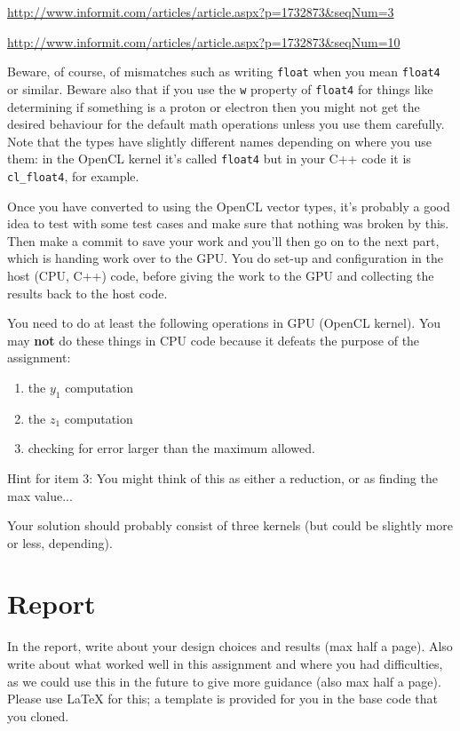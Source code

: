 \documentclass[letterpaper,10pt]{article}
\begin{document}
\begin{center}

\url{http://www.informit.com/articles/article.aspx?p=1732873&seqNum=3}

\url{http://www.informit.com/articles/article.aspx?p=1732873&seqNum=10}

\end{center}

Beware, of course, of mismatches such as writing \texttt{float} when you mean 
\texttt{float4} or similar. Beware also that if you use the \texttt{w} property 
of \texttt{float4} for things like determining if something is a proton or electron 
then you might not get the desired behaviour for the default math operations unless
you use them carefully. 
Note that the types have slightly different names 
depending on where you use them: in the OpenCL kernel it's called
\texttt{float4} but in your C++ code it is \texttt{cl\_float4}, for example. 

Once you have converted to using the OpenCL vector types, it's probably a good idea 
to test with some test cases and make sure that nothing was broken by this. Then make 
a commit to save your work and you'll then go on to the next part, which is handing 
work over to the GPU. You do set-up and configuration in the host (CPU, C++) code, before giving the work to the GPU and collecting the results back to the host code.

You need to do at least the following operations in GPU (OpenCL kernel). You may \textbf{ not } do these things in CPU code because it defeats the purpose of the assignment: 

\begin{enumerate}
\item the $y_{1}$ computation
\item the $z_{1}$ computation
\item checking for error larger than the maximum allowed.
\end{enumerate} 

Hint for item 3:  You might think of this as either a reduction, or as finding the max value...

Your solution should probably consist of three kernels (but could be slightly more or less, depending).

\section*{Report}
In the report, write about your design choices and results (max half a page). Also 
write about what worked well in this assignment and where you had difficulties, as
we could use this in the future to give more guidance (also max half a page). Please use LaTeX for this; a template is provided for you in the base code that you cloned. 
\end{document}
